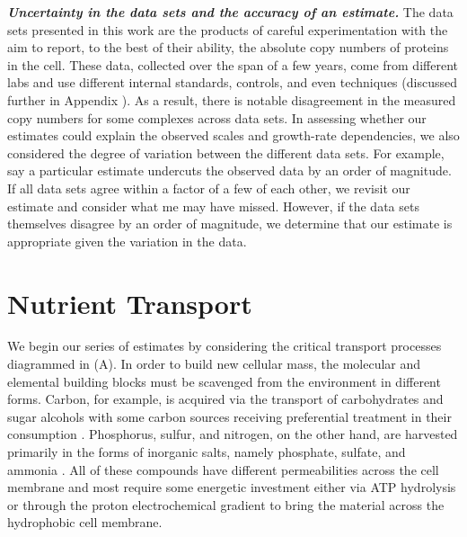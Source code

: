 \begin{featurebox}
\textbf{\itshape Uncertainty in the data sets and the accuracy of an estimate.}
The data sets presented in this work are the products of
careful experimentation with the aim to report, to the best of their ability,
the absolute copy numbers of proteins in the cell. These data, collected over
the span of a few years, come from different labs and use different internal
standards, controls, and even techniques (discussed further in Appendix ).
As a result, there is notable disagreement in the measured copy numbers for
some complexes across data sets. In assessing whether our estimates could explain the
observed scales and growth-rate dependencies, we also considered the degree of
variation between the different data sets. For example, say a particular
estimate undercuts the observed data by an order of magnitude. If all data sets
agree within a factor of a few of each other, we revisit our estimate and
consider what me may have missed. However, if the data sets themselves disagree
by an order of magnitude, we determine that our estimate is
appropriate given the variation in the data.
\label{box:estimate_rules}
\end{featurebox}


\section{Nutrient Transport}
We begin our series of estimates by considering the critical transport
processes diagrammed in (A). In order to build new cellular
mass, the molecular and elemental building blocks must be scavenged from the
environment in different forms. Carbon, for example, is acquired via the
transport of carbohydrates and sugar alcohols with some carbon sources
receiving preferential treatment in their consumption \citep{monod1947}.
Phosphorus, sulfur, and nitrogen, on the other hand, are harvested primarily
in the forms of inorganic salts, namely phosphate, sulfate, and ammonia
\citep{jun2018, assentoft2016, stasi2019, antonenko1997, rosenberg1977,
willsky1973}. All of these compounds have different permeabilities across the
cell membrane \citep{phillips2018} and most require some energetic investment
either via ATP hydrolysis or through the proton electrochemical gradient to
bring the material across the hydrophobic cell membrane.

